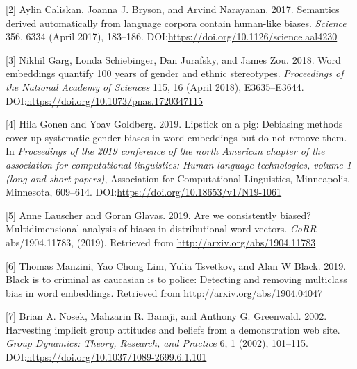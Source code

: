 \documentclass[12pt,dvipsnames,enabledeprecatedfontcommands]{scrartcl}
\begin{document}
\leavevmode\hypertarget{ref-Caliskan2017semanticsBiases}{}%
{[}2{]} Aylin Caliskan, Joanna J. Bryson, and Arvind Narayanan. 2017.
Semantics derived automatically from language corpora contain human-like
biases. \emph{Science} 356, 6334 (April 2017), 183--186.
DOI:\url{https://doi.org/10.1126/science.aal4230}

\leavevmode\hypertarget{ref-Garg2018years}{}%
{[}3{]} Nikhil Garg, Londa Schiebinger, Dan Jurafsky, and James Zou.
2018. Word embeddings quantify 100 years of gender and ethnic
stereotypes. \emph{Proceedings of the National Academy of Sciences} 115,
16 (April 2018), E3635--E3644.
DOI:\url{https://doi.org/10.1073/pnas.1720347115}

\leavevmode\hypertarget{ref-Gonen2019lipstick}{}%
{[}4{]} Hila Gonen and Yoav Goldberg. 2019. Lipstick on a pig: Debiasing
methods cover up systematic gender biases in word embeddings but do not
remove them. In \emph{Proceedings of the 2019 conference of the north
American chapter of the association for computational linguistics: Human
language technologies, volume 1 (long and short papers)}, Association
for Computational Linguistics, Minneapolis, Minnesota, 609--614.
DOI:\url{https://doi.org/10.18653/v1/N19-1061}

\leavevmode\hypertarget{ref-Lauscher2019multidimensional}{}%
{[}5{]} Anne Lauscher and Goran Glavas. 2019. Are we consistently
biased? Multidimensional analysis of biases in distributional word
vectors. \emph{CoRR} abs/1904.11783, (2019). Retrieved from
\url{http://arxiv.org/abs/1904.11783}

\leavevmode\hypertarget{ref-Manzini2019blackToCriminal}{}%
{[}6{]} Thomas Manzini, Yao Chong Lim, Yulia Tsvetkov, and Alan W Black.
2019. Black is to criminal as caucasian is to police: Detecting and
removing multiclass bias in word embeddings. Retrieved from
\url{http://arxiv.org/abs/1904.04047}

\leavevmode\hypertarget{ref-Nosek2002harvesting}{}%
{[}7{]} Brian A. Nosek, Mahzarin R. Banaji, and Anthony G. Greenwald.
2002. Harvesting implicit group attitudes and beliefs from a
demonstration web site. \emph{Group Dynamics: Theory, Research, and
Practice} 6, 1 (2002), 101--115.
DOI:\url{https://doi.org/10.1037/1089-2699.6.1.101}
\end{document}
